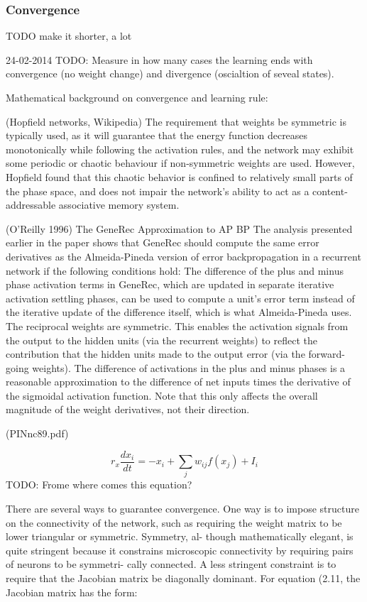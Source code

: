 \subsubsection{Convergence} 
\label{sec:convergence} 

TODO make it shorter, a lot

24-02-2014
TODO: Measure in how many cases the learning ends with convergence (no weight change) and divergence (oscialtion of seveal states). 

 Mathematical background on convergence and learning rule: 

(Hopfield networks, Wikipedia) The requirement that weights be symmetric is typically used, as it will guarantee that the energy function decreases monotonically while following the activation rules, and the network may exhibit some periodic or chaotic behaviour if non-symmetric weights are used. However, Hopfield found that this chaotic behavior is confined to relatively small parts of the phase space, and does not impair the network's ability to act as a content-addressable associative memory system.

(O'Reilly 1996) The GeneRec Approximation to AP BP
The analysis presented earlier in the paper shows that GeneRec should compute the same error derivatives as the Almeida-Pineda version of error backpropagation in a recurrent network if the following conditions hold:
  The difference of the plus and minus phase activation terms in GeneRec, which are updated in separate iterative activation settling phases, can be used to compute a unit’s error term instead of the iterative update of the difference itself, which is what Almeida-Pineda uses.
  The reciprocal weights are symmetric. This enables the activation signals from the output to the hidden units (via the recurrent weights) to reflect the contribution that the hidden units made to the output error (via the forward-going weights).
  The difference of activations in the plus and minus phases is a reasonable approximation to the difference of net inputs times the derivative of the sigmoidal activation function. Note that this only affects the overall magnitude of the weight derivatives, not their direction.
  
(PINnc89.pdf) 


$$r_x\frac{dx_i}{dt} = -x_i + \sum_j w_{ij} f(x_j) + I_i$$
TODO: Frome where comes this equation? 

There are several ways to guarantee convergence. One way is to
impose structure on the connectivity of the network, such as requiring
the weight matrix to be lower triangular or symmetric. Symmetry, al-
though mathematically elegant, is quite stringent because it constrains
microscopic connectivity by requiring pairs of neurons to be symmetri-
cally connected. A less stringent constraint is to require that the Jacobian
matrix be diagonally dominant. For equation (2.11, the Jacobian matrix
has the form: 


